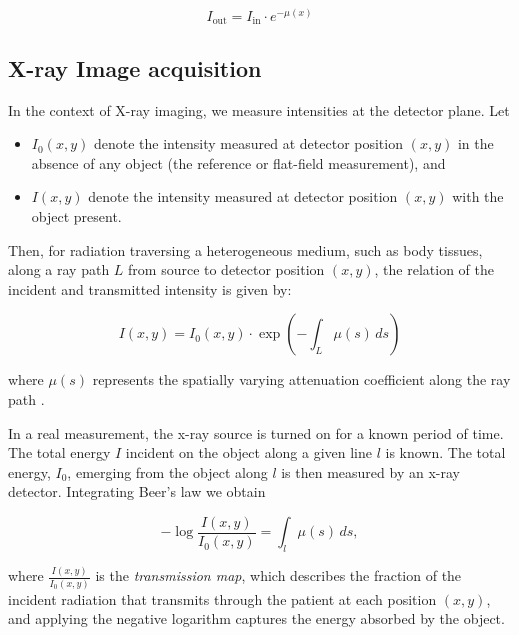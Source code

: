 \documentclass[nomenclature, english, bibtex]{kththesis}
\numberwithin{listing}{chapter}
\begin{document}
\begin{equation}
I_{\text{out}} = I_{\text{in}} \cdot e^{-\mu(x)}
\label{eq:beer_lambert}
\end{equation}

\subsection{X-ray Image acquisition}

In the context of X-ray imaging, we measure intensities at the detector plane. Let

\begin{itemize}
\item $I_0(x,y)$ denote the intensity measured at detector position $(x,y)$ in the absence
    of any object (the reference or flat-field measurement), and
\item $I(x,y)$ denote the intensity measured at detector position $(x,y)$ with the object present.
\end{itemize}

Then, for radiation traversing a heterogeneous medium, such as body tissues, along a ray path $L$
from source to detector position $(x,y)$, the relation of the incident and transmitted intensity is
given by:

\begin{equation}
I(x,y) = I_0(x,y) \cdot \exp\left(-\int_L \mu(s) \, ds\right)
\label{eq:beer_lambert_imaging}
\end{equation}

where $\mu(s)$ represents the spatially varying attenuation coefficient along the ray path \cite[p.~57]{epstein2008}.

In a real measurement, the x-ray source is turned on for a known period of time. The total energy
$I$ incident on the object along a given line $l$ is known. The total energy, $I_0$, emerging from the object
along $l$ is then measured by an x-ray detector. Integrating Beer’s law we obtain \cite[p.~60]{epstein2008}

\begin{equation}
    -\log \frac{I(x,y)}{I_0(x,y)} = \int_l \mu(s) \, ds,
\end{equation}

where $\frac{I(x, y)}{I_0(x, y)}$ is the \textit{transmission map}, which describes the fraction of the
incident radiation that transmits through the patient at each position $(x, y)$, and applying
the negative logarithm captures the energy absorbed by the object.
\end{document}
